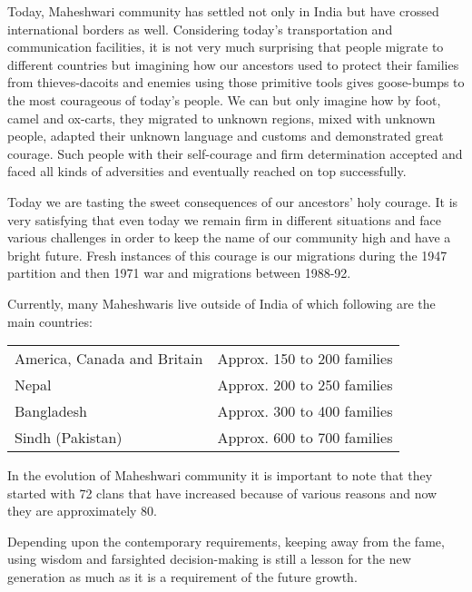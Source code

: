 Today, Maheshwari community has settled not only in India but have crossed
international borders as well. Considering today's transportation and
communication facilities, it is not very much surprising that people migrate to
different countries but imagining how our ancestors used to protect their
families from thieves-dacoits and enemies using those primitive tools gives
goose-bumps to the most courageous of today's people. We can but only imagine
how by foot, camel and ox-carts, they migrated to unknown regions, mixed with
unknown people, adapted their unknown language and customs and demonstrated
great courage. Such people with their self-courage and firm determination
accepted and faced all kinds of adversities and eventually reached on top
successfully.

Today we are tasting the sweet consequences of our ancestors' holy courage. It
is very satisfying that even today we remain firm in different situations and
face various challenges in order to keep the name of our community high and
have a bright future. Fresh instances of this courage is our migrations during
the 1947 partition and then 1971 war and migrations between 1988-92.

Currently, many Maheshwaris live outside of India of which following are the main countries:
\begin{center}
\begin{tabular}{ll}
America, Canada and Britain & Approx. 150 to 200 families \\ 
Nepal & Approx. 200 to 250 families \\ 
Bangladesh & Approx. 300 to 400 families \\ 
Sindh (Pakistan) & Approx. 600 to 700 families
\end{tabular}
\end{center}

In the evolution of Maheshwari community it is important to note that they
started with 72 clans that have increased because of various reasons and now
they are approximately 80.

Depending upon the contemporary requirements, keeping away from the fame, using
wisdom and farsighted decision-making is still a lesson for the new generation
as much as it is a requirement of the future growth.
